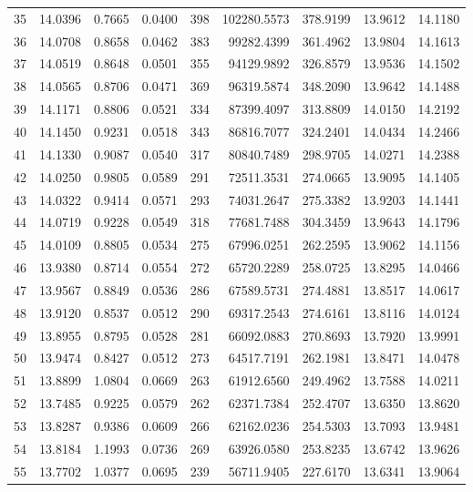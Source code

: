 \begin{longtable}{rrrrrrrrr}
35 & 14.0396 & 0.7665 & 0.0400 & 398 & 102280.5573 & 378.9199 & 13.9612 & 14.1180 \\
36 & 14.0708 & 0.8658 & 0.0462 & 383 & 99282.4399 & 361.4962 & 13.9804 & 14.1613 \\
37 & 14.0519 & 0.8648 & 0.0501 & 355 & 94129.9892 & 326.8579 & 13.9536 & 14.1502 \\
38 & 14.0565 & 0.8706 & 0.0471 & 369 & 96319.5874 & 348.2090 & 13.9642 & 14.1488 \\
39 & 14.1171 & 0.8806 & 0.0521 & 334 & 87399.4097 & 313.8809 & 14.0150 & 14.2192 \\
40 & 14.1450 & 0.9231 & 0.0518 & 343 & 86816.7077 & 324.2401 & 14.0434 & 14.2466 \\
41 & 14.1330 & 0.9087 & 0.0540 & 317 & 80840.7489 & 298.9705 & 14.0271 & 14.2388 \\
42 & 14.0250 & 0.9805 & 0.0589 & 291 & 72511.3531 & 274.0665 & 13.9095 & 14.1405 \\
43 & 14.0322 & 0.9414 & 0.0571 & 293 & 74031.2647 & 275.3382 & 13.9203 & 14.1441 \\
44 & 14.0719 & 0.9228 & 0.0549 & 318 & 77681.7488 & 304.3459 & 13.9643 & 14.1796 \\
45 & 14.0109 & 0.8805 & 0.0534 & 275 & 67996.0251 & 262.2595 & 13.9062 & 14.1156 \\
46 & 13.9380 & 0.8714 & 0.0554 & 272 & 65720.2289 & 258.0725 & 13.8295 & 14.0466 \\
47 & 13.9567 & 0.8849 & 0.0536 & 286 & 67589.5731 & 274.4881 & 13.8517 & 14.0617 \\
48 & 13.9120 & 0.8537 & 0.0512 & 290 & 69317.2543 & 274.6161 & 13.8116 & 14.0124 \\
49 & 13.8955 & 0.8795 & 0.0528 & 281 & 66092.0883 & 270.8693 & 13.7920 & 13.9991 \\
50 & 13.9474 & 0.8427 & 0.0512 & 273 & 64517.7191 & 262.1981 & 13.8471 & 14.0478 \\
51 & 13.8899 & 1.0804 & 0.0669 & 263 & 61912.6560 & 249.4962 & 13.7588 & 14.0211 \\
52 & 13.7485 & 0.9225 & 0.0579 & 262 & 62371.7384 & 252.4707 & 13.6350 & 13.8620 \\
53 & 13.8287 & 0.9386 & 0.0609 & 266 & 62162.0236 & 254.5303 & 13.7093 & 13.9481 \\
54 & 13.8184 & 1.1993 & 0.0736 & 269 & 63926.0580 & 253.8235 & 13.6742 & 13.9626 \\
55 & 13.7702 & 1.0377 & 0.0695 & 239 & 56711.9405 & 227.6170 & 13.6341 & 13.9064 \\

\end{longtable}
